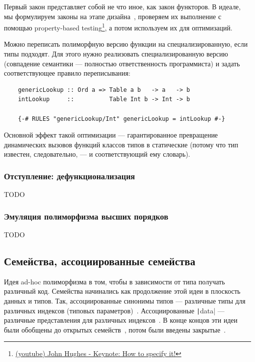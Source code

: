 Первый закон представляет собой не что иное, как закон функторов.
В идеале, мы формулируем законы на этапе дизайна~\cite{maguire-algebra}, проверяем их выполнение с помощью property-based testing\footnote{\href{https://youtu.be/G0NUOst-53U?si=vdcKVUi9vSPBY0Jz}{(youtube) John Hughes - Keynote: How to specify it!}}, а потом используем их для оптимизаций.

Можно переписать полиморфную версию функции на специализированную, если типы подходят.
Для этого нужно реализовать специализированную версию (совпадение семантики --- полностью ответственность программиста) и задать соответствующее правило переписывания:
\begin{verbatim}
    genericLookup :: Ord a => Table a b   -> a   -> b
    intLookup     ::          Table Int b -> Int -> b

    {-# RULES "genericLookup/Int" genericLookup = intLookup #-}
\end{verbatim}

Основной эффект такой оптимизации --- гарантированное превращение динамических вызовов функций классов типов в статические (потому что тип известен, следовательно, --- и соответствующий ему словарь).

\subsubsection{Отступление: дефункционализация} \label{subsubsec:defunctionalization}

TODO %

\subsubsection{Эмуляция полиморфизма высших порядков}

TODO %

\subsection{Семейства, ассоциированные семейства}

Идея ad-hoc полиморфизма в том, чтобы в зависимости от типа получать различный код.
Семейства начинались как продолжение этой идеи в плоскость данных и типов.
Так, ассоциированные синонимы типов --- различные типы для различных индексов (типовых параметров)~\cite{chakravarty2005associated-syn}.
Ассоциированные \texttt|data| --- различные представления для различных индексов~\cite{chakravarty2005associated}.
В конце концов эти идеи были обобщены до открытых семейств~\cite{schrijvers2008type}, потом были введены закрытые~\cite{eisenberg2014closed}.

